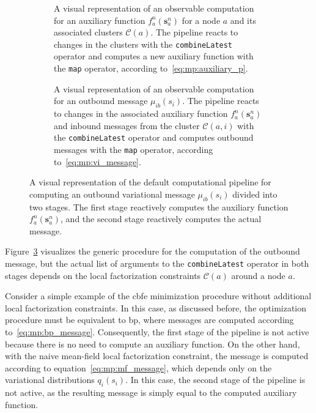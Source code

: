 \begin{figure}
  \centering
  \begin{subfigure}[t]{0.95\textwidth}
    \centering
    \resizebox{0.95\textwidth}{!}{}
    \caption{A visual representation of an observable computation for an auxiliary function $f^n_a(\bm{s}^n_a)$ for a node $a$ and its associated clusters $\mathcal{C}(a)$.
      The pipeline reacts to changes in the clusters with the \texttt{combineLatest} operator and
      computes a new auxiliary function with the \texttt{map} operator, according
      to~\eqref{eq:mp:auxiliary_p}.
    }
    \label{fig:rmp:reactive_node_auxiliary_p_stage}
  \end{subfigure}
  \hfill
  \begin{subfigure}[t]{\textwidth}
    \centering
    \resizebox{0.95\textwidth}{!}{}
    \caption{A visual representation of an observable computation for an outbound message $\mu_{ib}(s_i)$.
      The pipeline reacts to changes in the associated auxiliary function $f^n_a(\bm{s}^n_a)$ and
      inbound messages from the cluster $\mathcal{C}(a, i)$ with the \texttt{combineLatest} operator
      and computes outbound messages with the \texttt{map} operator, according
      to~\eqref{eq:mp:vi_message}.
    }
    \label{fig:rmp:reactive_node_message_stage}
  \end{subfigure}
  \caption{A visual representation of the default computational pipeline for computing an outbound variational message $\mu_{ib}(s_i)$ divided into two stages.
    The first stage reactively computes the auxiliary function $f^n_a(\bm{s}^n_a)$, and the second
    stage reactively computes the actual message.
  }
  \label{fig:rmp:reactive_node}
\end{figure}

Figure~\ref{fig:rmp:reactive_node} visualizes the generic procedure for the computation of the outbound message, 
but the actual list of arguments to the \texttt{combineLatest} operator in both
stages depends on the local factorization constraints $\mathcal{C}(a)$ around a node $a$.

Consider a simple example of the \ac{cbfe} minimization procedure without additional local
factorization constraints.
In this case, as discussed before, the optimization procedure must be equivalent to
\ac{bp}, where messages are computed according to~\eqref{eq:mp:bp_message}.
Consequently, the first stage of the pipeline is not active because there is no need to compute an
auxiliary function.
On the other hand, with the naive mean-field local factorization constraint, the message is
computed according to equation~\eqref{eq:mp:mf_message}, which depends only on the variational
distributions $q_i(s_i)$.
In this case, the second stage of the pipeline is not active, as the resulting message is
simply equal to the computed auxiliary function.

